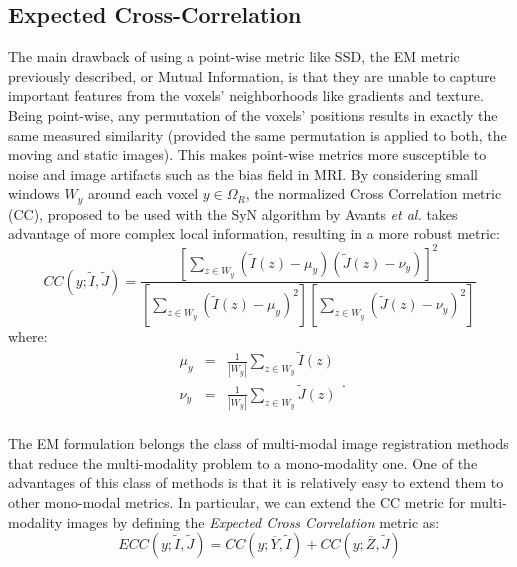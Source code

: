 \subsection{Expected Cross-Correlation}\label{sec:syn_ecc}
The main drawback of using a point-wise metric like SSD, the EM metric previously described, or Mutual Information, is that
they are unable to capture important features from the voxels' neighborhoods like gradients and texture. Being point-wise, any permutation of the voxels' positions results in
exactly the same measured similarity (provided the same permutation is applied to both, the moving and static images). This makes point-wise metrics more susceptible to noise and
image artifacts such as the bias field in MRI. By considering small windows $W_{y}$ around each voxel $y\in\Omega_{R}$, the normalized Cross Correlation metric (CC), proposed to
be used with the SyN algorithm by Avants {\it et al.} \cite{Avants2008} takes advantage of more complex local information, resulting in a more robust metric:
\begin{equation}
    CC(y;\tilde{I}, \tilde{J}) = \frac{\left[\sum_{z\in W_{y}} \left(\tilde{I}(z) - \mu_{y}\right)\left(\tilde{J}(z) - \nu_{y}\right)\right]^{2}}
    {\left[\sum_{z \in W_{y}}\left(\tilde{I}(z) - \mu_{y}\right)^{2}\right] \left[\sum_{z \in W_{y}}\left(\tilde{J}(z) - \nu_{y}\right)^{2}\right]}
\end{equation}
where:
\begin{equation}
    \begin{array}{lll}
        \mu_{y} &=& \frac{1}{|W_{y}|}\sum_{z \in W_{y}}\tilde{I}(z)\\
        \nu_{y} &=& \frac{1}{|W_{y}|}\sum_{z \in W_{y}}\tilde{J}(z)\\
    \end{array}.
\end{equation}

The EM formulation belongs the class of multi-modal image registration methods that reduce the multi-modality problem to a mono-modality one\cite{Sotiras2013}. One of the
advantages of this class of methods is that it is relatively easy to extend them to other mono-modal metrics. In particular, we can extend the CC metric for multi-modality images
by defining the {\it Expected Cross Correlation} metric as:
\begin{equation}
    ECC(y;\tilde{I}, \tilde{J}) = CC(y; \overline{Y}, \tilde{I}) + CC(y; \overline{Z}, \tilde{J})
\end{equation}

